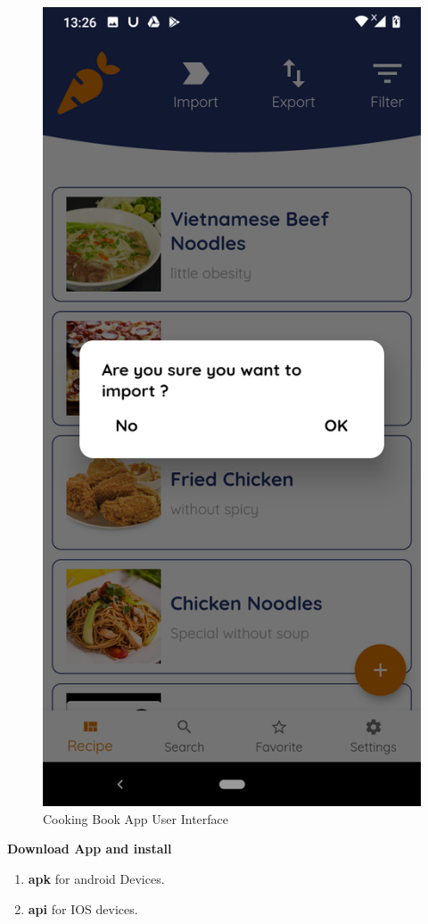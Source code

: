 \documentclass{article}
\begin{document}
\begin{figure}[h!]
    \includegraphics[scale=0.1]{Images/Import_annouce.jpg}
    \caption{Cooking Book App User Interface}
    \label{fig:cookingbook}
\end{figure}
\textbf{Download App and install}  \\
\begin{enumerate}
        \item \textbf{apk} for android Devices.
        \item \textbf{api} for IOS devices.
\end{enumerate}
\newpage
\end{document}
